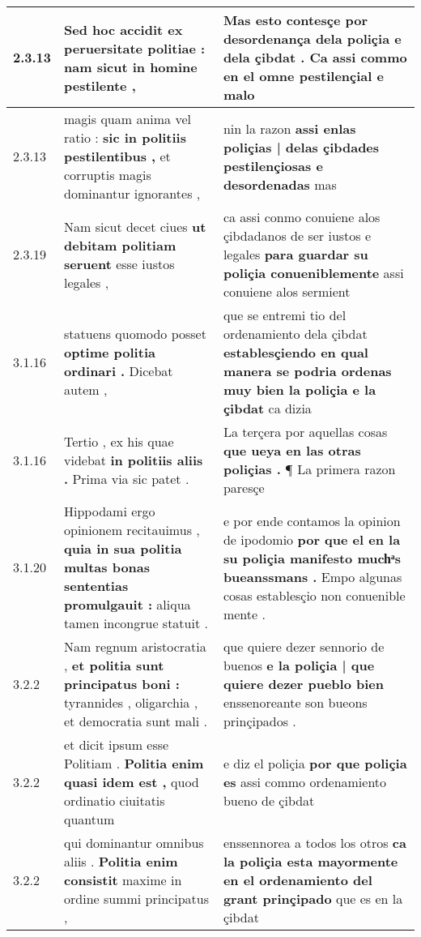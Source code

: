 \begin{tabular}{|p{1cm}|p{6.5cm}|p{6.5cm}|}

\hline
2.3.13 & Sed hoc accidit \textbf{ ex peruersitate politiae : } nam sicut in homine pestilente , & Mas esto contesçe \textbf{ por desordenança dela poliçia e dela çibdat . } Ca assi commo en el omne pestilençial e malo \\\hline
2.3.13 & magis quam anima vel ratio : \textbf{ sic in politiis pestilentibus , } et corruptis magis dominantur ignorantes , & nin la razon \textbf{ assi enlas poliçias | delas çibdades pestilençiosas e desordenadas } mas \\\hline
2.3.19 & Nam sicut decet ciues \textbf{ ut debitam politiam seruent } esse iustos legales , & ca assi conmo conuiene alos çibdadanos de ser iustos e legales \textbf{ para guardar su poliçia conueniblemente } assi conuiene alos sermient \\\hline
3.1.16 & statuens quomodo posset \textbf{ optime politia ordinari . } Dicebat autem , & que se entremi tio del ordenamiento dela çibdat \textbf{ establesçiendo en qual manera se podria ordenas muy bien la poliçia e la çibdat } ca dizia \\\hline
3.1.16 & Tertio , ex his quae videbat \textbf{ in politiis aliis . } Prima via sic patet . & La terçera por aquellas cosas \textbf{ que ueya en las otras poliçias . } ¶ La primera razon paresçe \\\hline
3.1.20 & Hippodami ergo opinionem recitauimus , \textbf{ quia in sua politia multas bonas sententias promulgauit : } aliqua tamen incongrue statuit . & e por ende contamos la opinion de ipodomio \textbf{ por que el en la su poliçia manifesto muchͣs bueanssmans . } Empo algunas cosas establesçio non conuenible mente . \\\hline
3.2.2 & Nam regnum aristocratia , \textbf{ et politia sunt principatus boni : } tyrannides , oligarchia , et democratia sunt mali . & que quiere dezer sennorio de buenos \textbf{ e la poliçia | que quiere dezer pueblo bien } enssenoreante son bueons prinçipados . \\\hline
3.2.2 & et dicit ipsum esse Politiam . \textbf{ Politia enim quasi idem est , } quod ordinatio ciuitatis quantum & e diz el poliçia \textbf{ por que poliçia es } assi commo ordenamiento bueno de çibdat \\\hline
3.2.2 & qui dominantur omnibus aliis . \textbf{ Politia enim consistit } maxime in ordine summi principatus , & enssennorea a todos los otros \textbf{ ca la poliçia esta mayormente en el ordenamiento del grant prinçipado } que es en la çibdat \\\hline

\end{tabular}
